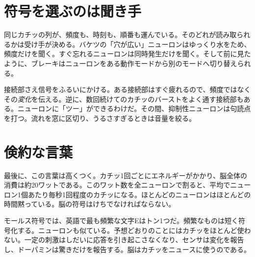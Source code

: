 \section*{符号を選ぶのは聞き手}

同じカチッの列が、頻度も、時刻も、順番も運んでいる。そのどれが読み取られるかは受け手が決める。バケツの「穴が広い」ニューロンはゆっくり水をため、頻度だけを聞く。すぐ忘れるニューロンは同時発生だけを聞く。そして前に見たように、ブレーキはニューロンをある動作モードから別のモードへ切り替えられる。

接続部さえ信号をふるいにかける。ある接続部はすぐ疲れるので、頻度ではなくその\emph{変化}を伝える。逆に、数回続けてのカチッのバーストをよく通す接続部もある。ニューロンに「ツー」ができるわけだ。その間、抑制性ニューロンは句読点を打つ。流れを窓に区切り、うるさすぎるときは音量を絞る。

\section*{倹約な言葉}

最後に、この言葉は高くつく。カチッ1回ごとにエネルギーがかかり、脳全体の消費は約20ワットである。このワット数を全ニューロンで割ると、平均でニューロン1個あたり毎秒1回程度のカチッになる。ほとんどのニューロンはほとんどの時間黙っている。脳の符号はけちでなければならない。

モールス符号では、英語で最も頻繁な文字Eはトン1つだ。頻繁なものは短く符号化する。ニューロンも似ている。予想どおりのことにはカチッをほとんど使わない。一定の刺激はしだいに応答を引き起こさなくなり、センサは変化を報告し、ドーパミンは驚きだけを報告する。脳はカチッをニュースに使うのである。

